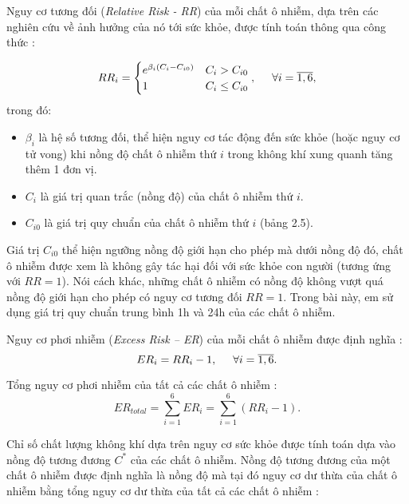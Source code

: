 \documentclass[14pt]{extreport}
\theoremstyle{definition}
\theoremstyle{plain}
\theoremstyle{remark}
\begin{document}
Nguy cơ tương đối (\textit{Relative Risk - RR}) của mỗi chất ô nhiễm, dựa trên các nghiên cứu về ảnh hưởng của nó tới sức khỏe, được tính toán thông qua công thức \cite{Cairncross2007}:

\begin{equation}
RR_i =
\begin{cases}  
e^{\beta_i\left(C_i - C_{i0} \right)}      &C_i > C_{i0} \\ 
1          &C_i \leq C_{i0}
\end{cases} 
  , \hspace{0.5cm} \forall i = \overline{1, 6},
\end{equation}
trong đó:
\begin{itemize}
\item $\beta_i$ là hệ số tương đối, thể hiện nguy cơ tác động đến sức khỏe (hoặc nguy cơ tử vong) khi nồng độ chất ô nhiễm thứ $i$ trong không khí xung quanh tăng thêm 1 đơn vị.
\item $C_i$ là giá trị quan trắc (nồng độ) của chất ô nhiễm thứ $i$.
\item $C_{i0}$ là giá trị quy chuẩn của chất ô nhiễm thứ $i$ (bảng 2.5).
\end{itemize}

Giá trị $C_{i0}$ thể hiện ngưỡng nồng độ giới hạn cho phép mà dưới nồng độ đó, chất ô nhiễm được xem là không gây tác hại đối với sức khỏe con người (tương ứng với $RR=1$). Nói cách khác, những chất ô nhiễm có nồng độ không vượt quá nồng độ giới hạn cho phép có nguy cơ tương đối $RR=1$. Trong bài này, em sử dụng giá trị quy chuẩn trung bình 1h và 24h của các chất ô nhiễm.

Nguy cơ phơi nhiễm (\textit{Excess Risk – ER}) của mỗi chất ô nhiễm được định nghĩa \cite{Cairncross2007}:
\begin{equation}
ER_i = RR_i - 1, \hspace{0.5cm} \forall i=\overline{1,6}.
\end{equation}

Tổng nguy cơ phơi nhiễm của tất cả các chất ô nhiễm \cite{Cairncross2007}:
\begin{equation}
ER_{total} = \sum_{i=1}^6 ER_i = \sum_{i=1}^6 (RR_i - 1).
\end{equation}

Chỉ số chất lượng không khí dựa trên nguy cơ sức khỏe được tính toán dựa vào nồng độ tương đương $C^*$ của các chất ô nhiễm. Nồng độ tương đương của một chất ô nhiễm được định nghĩa là nồng độ mà tại đó nguy cơ dư thừa của chất ô nhiễm bằng tổng nguy cơ dư thừa của tất cả các chất ô nhiễm \cite{Cairncross2007}:
\end{document}
